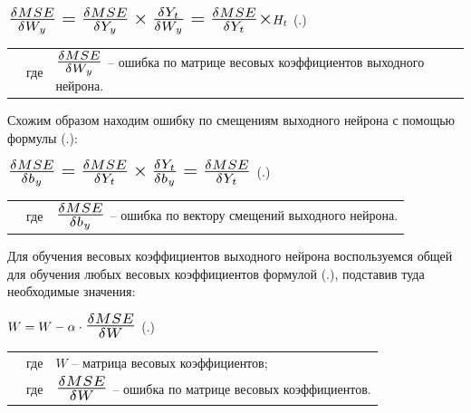 {  \formulaspace \par \redline 
    $\scaleto{\frac{\delta MSE}{\delta W_y} = \frac{\delta MSE}{\delta Y_y} \times \frac{\delta Y_t}{\delta W_y} = \frac{\delta MSE}{\delta Y_t} \times }{21pt} H_t$
    \hfill (\thechaptercntr .\theformulacntr) \redline
  \formulaspace \addtocounter{formulacntr}{1}

  \begin{tabular}{p{}p{}p{}}
		& где  & $\scaleto{\frac{\delta MSE}{\delta W_y}}{20pt}$ {--} ошибка по матрице весовых коэффициентов выходного нейрона. \\
  \end{tabular}

  \par \redline Схожим образом находим ошибку по смещениям выходного нейрона с помощью формулы (\thechaptercntr .\theformulacntr):

  \formulaspace \par \redline 
    $\scaleto{\frac{\delta MSE}{\delta b_y} = \frac{\delta MSE}{\delta Y_t} \times \frac{\delta Y_t}{\delta b_y} = \frac{\delta MSE}{\delta Y_t}}{21pt}$
    \hfill (\thechaptercntr .\theformulacntr) \redline
  \formulaspace \addtocounter{formulacntr}{1}

  \begin{tabular}{p{}p{}p{}}
		& где  & $\scaleto{\frac{\delta MSE}{\delta b_y}}{21pt}$ {--} ошибка по вектору смещений выходного нейрона. \\
  \end{tabular}

  \par \redline Для обучения весовых коэффициентов выходного нейрона воспользуемся общей для обучения любых весовых коэффициентов формулой (\thechaptercntr .\theformulacntr), подставив туда необходимые значения:

  \formulaspace \par \redline 
    $W = W - \alpha \cdot \scaleto{\frac{\delta MSE}{\delta W}}{19pt}$
    \hfill (\thechaptercntr .\theformulacntr) \redline
  \formulaspace \addtocounter{formulacntr}{1}

  \begin{tabular}{p{}p{}p{}}
		& где  & $W$ {--} матрица весовых коэффициентов; \\
    & где  & $\scaleto{\frac{\delta MSE}{\delta W}}{19pt}$ {--} ошибка по матрице весовых коэффициентов. \\
  \end{tabular}

}

